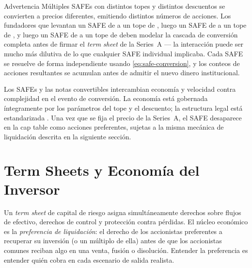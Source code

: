 \begin{admonition}{Advertencia}
Múltiples SAFEs con distintos topes y distintos descuentos se convierten a precios
diferentes, emitiendo distintos números de acciones. Los fundadores que levantan un SAFE de
 a un tope de , luego un SAFE de  a un tope de
, y luego un SAFE de  a un tope de  deben
modelar la cascada de conversión completa antes de firmar el \emph{term sheet} de la
Series~A --- la interacción puede ser mucho más dilutiva de lo que cualquier SAFE individual
implicaba. Cada SAFE se resuelve de forma independiente usando \cref{eq:safe-conversion}, y
los conteos de acciones resultantes se acumulan antes de admitir el nuevo dinero
institucional.
\end{admonition}

Los SAFEs y las notas convertibles intercambian economía y velocidad contra complejidad en
el evento de conversión. La economía está gobernada íntegramente por los parámetros del
tope y el descuento; la estructura legal está estandarizada \parencite{feld2019venture}. Una
vez que se fija el precio de la Series~A, el SAFE desaparece en la cap table como acciones
preferentes, sujetas a la misma mecánica de liquidación descrita en la siguiente sección.

\section{Term Sheets y Economía del Inversor}\label{sec:term-sheets}

Un \emph{term sheet} de capital de riesgo asigna simultáneamente derechos sobre flujos de
efectivo, derechos de control y protección contra pérdidas. El núcleo económico es la
\emph{preferencia de liquidación}: el derecho de los accionistas preferentes a recuperar su
inversión (o un múltiplo de ella) antes de que los accionistas comunes reciban algo en una
venta, fusión o disolución. Entender la preferencia es entender quién cobra en cada
escenario de salida realista.

